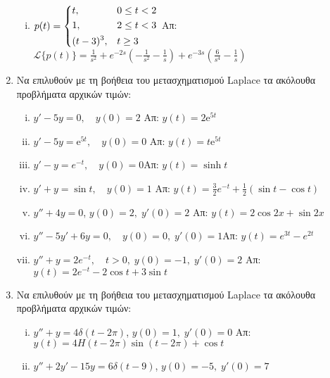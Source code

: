 \begin{enumerate}
\begin{enumerate}[i)]
      \item $p(t)=
        \begin{dcases} 
          t, & 0\leq t< 2 \\ 1, & 2\leq t < 3 \\ (t-3)^{3}, & t\geq 3
        \end{dcases}$ 
        \hfill Απ: $\mathcal{L}\{p(t)\}=\frac{1}{s^{2}}+e^{-2s}
        \left(-\frac{1}{s^{2}}-\frac{1}{s}\right)+e^{-3s}
        \left(\frac{6}{s^{4}}-\frac{1}{s}\right)$
    \end{enumerate}

  \item Να επιλυθούν με τη βοήθεια του μετασχηματισμού Laplace τα ακόλουθα 
    προβλήματα αρχικών τιμών:
    \begin{enumerate}[i)]
      \item $ y'-5y=0, \quad y(0) = 2$ \hfill Απ: $ y(t) = 2 \mathrm{e}^{5t} $ 
      \item $ y'-5y= \mathrm{e}^{5t}, \quad y(0)=0 $ \hfill Απ: $ y(t) = t
        \mathrm{e}^{5t} $ 
      \item $y'-y=e^{-t},\quad y(0)=0$\hfill Απ: $y(t)=\sinh t$
      \item $y'+y=\sin t,\quad y(0)=1$
        \hfill Απ: $y(t)=\frac{3}{2}e^{-t}+\frac{1}{2}(\sin t-\cos t)$
      \item $ y''+4y=0 $, \quad $ y(0)=2, \; y'(0)=2 $
        \hfill Απ: $ y(t)=2 \cos{2x} + \sin{2x} $ 
      \item $y''-5y'+6y=0,\quad y(0)=0, \; y'(0)=1$\hfill Απ: $y(t)=e^{3t}-e^{2t}$
      \item $y''+y=2e^{-t},\quad t>0, \; y(0)=-1, \; y'(0)=2$
        \hfill Απ: $y(t)=2e^{-t}-2\cos t+3\sin t$
    \end{enumerate}

  \item Να επιλυθούν με τη βοήθεια του μετασχηματισμού Laplace τα ακόλουθα 
    προβλήματα αρχικών τιμών:
    \begin{enumerate}[i)]
      \item $ y''+y=4 \delta (t-2 \pi) $, \quad $ y(0)=1, \; y'(0)=0 $ 
        \hfill Απ: $ y(t) = 4 H(t-2 \pi) \sin{(t- 2 \pi)} + \cos{t}  $ 
      \item $ y''+2y'-15y=6 \delta (t-9) $, \quad $ y(0)=-5, \; y'(0)=7 $


\end{enumerate}
\end{enumerate}
